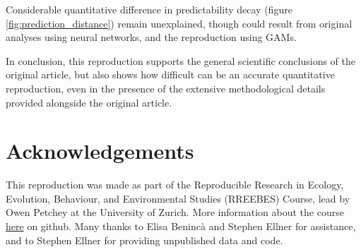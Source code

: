 \documentclass[10pt,a4paper,onecolumn]{article}
\begin{document}
Considerable quantitative difference in predictability decay (figure
\ref{fig:prediction_distance}) remain unexplained, though could result
from original analyses using neural networks, and the reproduction using
GAMs.

In conclusion, this reproduction supports the general scientific
conclusions of the original article, but also shows how difficult can be
an accurate quantitative reproduction, even in the presence of the
extensive methodological details provided alongside the original
article.

\section{Acknowledgements}\label{acknowledgements}

This reproduction was made as part of the Reproducible Research in
Ecology, Evolution, Behaviour, and Environmental Studies (RREEBES)
Course, lead by Owen Petchey at the University of Zurich. More
information about the course
\href{https://github.com/opetchey/RREEBES/blob/master/README.md}{here}
on github. Many thanks to Elisa Benincà and Stephen Ellner for
assistance, and to Stephen Ellner for providing unpublished data and
code.

{\sffamily \small
  \printbibliography[title=References]
}
\end{document}

